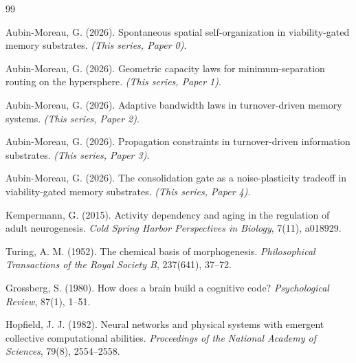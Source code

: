 \documentclass[11pt]{article}
\begin{document}
\begin{thebibliography}{99}

Aubin-Moreau, G. (2026).
Spontaneous spatial self-organization in viability-gated memory substrates.
\textit{(This series, Paper 0)}.

Aubin-Moreau, G. (2026).
Geometric capacity laws for minimum-separation routing on the hypersphere.
\textit{(This series, Paper 1)}.

Aubin-Moreau, G. (2026).
Adaptive bandwidth laws in turnover-driven memory systems.
\textit{(This series, Paper 2)}.

Aubin-Moreau, G. (2026).
Propagation constraints in turnover-driven information substrates.
\textit{(This series, Paper 3)}.

Aubin-Moreau, G. (2026).
The consolidation gate as a noise-plasticity tradeoff in viability-gated memory substrates.
\textit{(This series, Paper 4)}.

 Kempermann, G. (2015). Activity dependency and aging in the regulation of adult neurogenesis. \textit{Cold Spring Harbor Perspectives in Biology}, 7(11), a018929.

 Turing, A. M. (1952). The chemical basis of morphogenesis. \textit{Philosophical Transactions of the Royal Society B}, 237(641), 37--72.

 Grossberg, S. (1980). How does a brain build a cognitive code? \textit{Psychological Review}, 87(1), 1--51.

 Hopfield, J. J. (1982). Neural networks and physical systems with emergent collective computational abilities. \textit{Proceedings of the National Academy of Sciences}, 79(8), 2554--2558.

\end{thebibliography}
\end{document}
